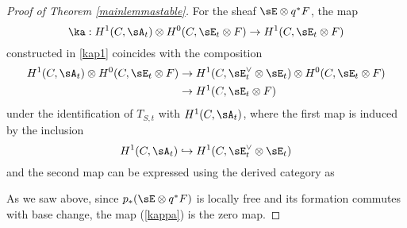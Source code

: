 \begin{proof}[Proof of Theorem \ref{mainlemmastable}]
For the sheaf $\sE \otimes q^*F$, the map
\begin{equation}\label{kappa}
    \ka: H^1(C, \sA_t) \otimes H^0(C, \sE_t \otimes F) \to H^1(C, \sE_t \otimes F)
\end{equation}
constructed in \eqref{kap1} coincides with the composition
\begin{align*}
    H^1(C, \sA_t) \otimes H^0(C, \sE_t \otimes F) & \to H^1(C, \sE_t^\vee \otimes \sE_t) \otimes H^0(C, \sE_t \otimes F) \\
    & \to H^1(C, \sE_t \otimes F) 
\end{align*}
under the identification of $T_{S,t}$ with $H^1(C, \sA_t)$, where the first map is induced by the inclusion 
\[ H^1(C, \sA_t) \hookrightarrow H^1(C, \sE_t^\vee \otimes \sE_t) \] 
and the second map can be expressed using the derived category as
\begin{center}
\end{center}
As we saw above, since $p_*(\sE \otimes q^*F)$ is locally free and its formation commutes with base change, the map (\ref{kappa}) is the zero map. 


\end{proof}

